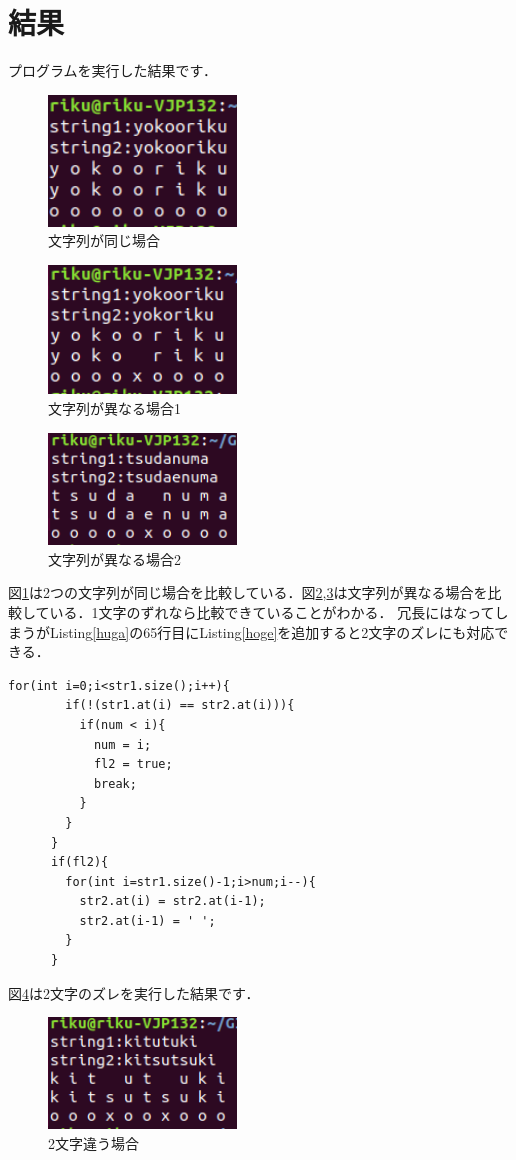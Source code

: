 \documentclass[dvipdfmx]{jsarticle}
\begin{document}
\section{結果}
プログラムを実行した結果です．
\begin{figure}[H]
  \centering
  \includegraphics[width=5cm]{images/onaji.png}
  \caption{文字列が同じ場合}
  \label{onaji}
\end{figure}
\begin{figure}[H]
  \centering
  \includegraphics[width=5cm]{images/riku.png}
  \caption{文字列が異なる場合1}
  \label{riku}
\end{figure}
\begin{figure}[H]
  \centering
  \includegraphics[width=5cm]{images/tsudanuma.png}
  \caption{文字列が異なる場合2}
  \label{tsu}
\end{figure}
図\ref{onaji}は2つの文字列が同じ場合を比較している．図\ref{riku},\ref{tsu}は文字列が異なる場合を比較している．1文字のずれなら比較できていることがわかる．
冗長にはなってしまうがListing\ref{huga}の65行目にListing\ref{hoge}を追加すると2文字のズレにも対応できる．
\begin{lstlisting}[caption=追加するプログラム,label=hoge]
      for(int i=0;i<str1.size();i++){
        if(!(str1.at(i) == str2.at(i))){
          if(num < i){
            num = i;
            fl2 = true;
            break;
          }
        }
      }
      if(fl2){
        for(int i=str1.size()-1;i>num;i--){
          str2.at(i) = str2.at(i-1);
          str2.at(i-1) = ' ';
        }
      }
\end{lstlisting}
図\ref{2moji}は2文字のズレを実行した結果です．
\begin{figure}[H]
  \centering
  \includegraphics[width=5cm]{images/2moji.png}
  \caption{2文字違う場合}
  \label{2moji}
\end{figure}
\end{document}
